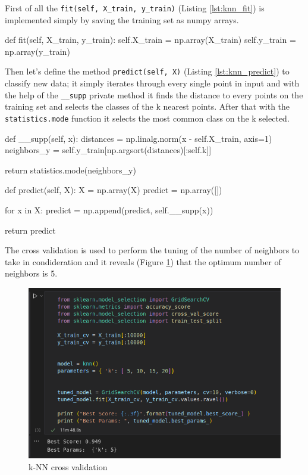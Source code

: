 \documentclass[12pt]{article}
\begin{document}
First of all the \verb|fit(self, X_train, y_train)| (Listing \ref{lst:knn_fit}) 
is implemented simply
by saving the training set as numpy arrays.

\begin{python}[caption={k-NN fit method},label={lst:knn_fit}]
def fit(self, X_train, y_train):
    self.X_train = np.array(X_train)
    self.y_train = np.array(y_train)
\end{python}

Then let's define the method \verb|predict(self, X)| (Listing \ref{lst:knn_predict}) 
to classify new data; it simply iterates through every single point in input and 
with the help of the \verb|__supp| private method it finds the distance to every 
points on the training set and selects the classes of the k nearest points. 
After that with the \verb|statistics.mode| function it selects the most common 
class on the k selected.

\pagebreak
\begin{python}[caption={k-NN predict method},label={lst:knn_predict}]
def __supp(self, x):
    distances = np.linalg.norm(x - self.X_train, axis=1)
    neighbors_y = self.y_train[np.argsort(distances)[:self.k]]

    return statistics.mode(neighbors_y)


def predict(self, X):
    X = np.array(X)
    predict = np.array([])

    for x in X:
        predict = np.append(predict, self.__supp(x))

    return predict
\end{python}

The cross validation is used to perform the tuning of the number of neighbors to take
in condideration and it reveals (Figure \ref{fig:knn_cross}) that the optimum number of neighbors is 5.

\begin{figure}[H]
    \centering
    \includegraphics[scale=0.6]{knn_cross.png}
    \caption{k-NN cross validation}
    \label{fig:knn_cross}
\end{figure}
\end{document}
